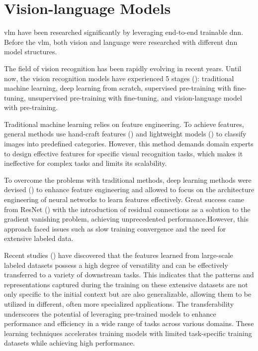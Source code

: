 
\section{Vision-language Models}
\acrshort{vlm} have been researched significantly by leveraging end-to-end trainable \acrfull{dnn}. Before the \acrshort{vlm}, both vision and language were researched with different \acrshort{dnn} model structures. 

The field of vision recognition has been rapidly evolving in recent years. Until now, the vision recognition models have experienced 5 stages (\cite{zhang2024visionlanguagemodelsvisiontasks}): traditional machine learning, deep learning from scratch, supervised pre-training with fine-tuning, unsupervised pre-training with fine-tuning, and vision-language model with pre-training.

Traditional machine learning relies on feature engineering. To achieve features, general methods use hand-craft features (\cite{svmclassification}) and lightweight models (\cite{knn, svm}) to classify images into predefined categories. However, this method demands domain experts to design effective features for specific visual recognition tasks, which makes it ineffective for complex tasks and limits its scalability.

To overcome the problems with traditional methods, deep learning methods were devised (\cite{imagenet, dnn_imagerecognition}) to enhance feature engineering and allowed to focus on the architecture engineering of neural networks to learn features effectively. Great success came from ResNet (\cite{resnet}) with the introduction of residual connections as a solution to the gradient vanishing problem, achieving unprecedented performance.However, this approach faced issues such as slow training convergence and the need for extensive labeled data. 

Recent studies (\cite{radford2021learning}) have discovered that the features learned from large-scale labeled datasets possess a high degree of versatility and can be effectively transferred to a variety of downstream tasks. This indicates that the patterns and representations captured during the training on these extensive datasets are not only specific to the initial context but are also generalizable, allowing them to be utilized in different, often more specialized applications. The transferability underscores the potential of leveraging pre-trained models to enhance performance and efficiency in a wide range of tasks across various domains. 
These learning techniques accelerates training models with limited task-specific training datasets while achieving high performance.

